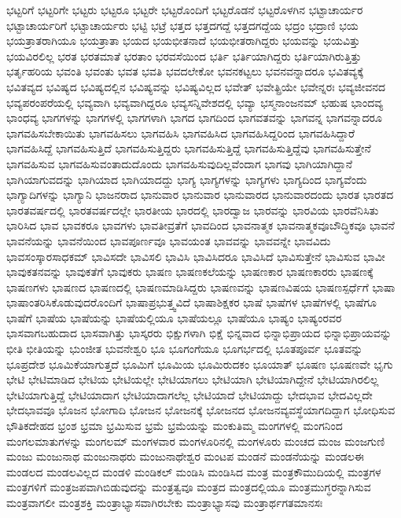 {ಭಟ್ಟರಿಗೆ
ಭಟ್ಟರಿಗೇ
ಭಟ್ಟರು
ಭಟ್ಟರೂ
ಭಟ್ಟರೇ
ಭಟ್ಟರೊಂದಿಗೆ
ಭಟ್ಟರೊಡನೆ
ಭಟ್ಟರೊಳಗಿನ
ಭಟ್ಟಾಚಾರ್ಯರ
ಭಟ್ಟಾಚಾರ್ಯರಿಗೆ
ಭಟ್ಟಾಚಾರ್ಯರು
ಭಟ್ಟಿ
ಭಟ್ರೆ
ಭತ್ತದ
ಭತ್ತದಗದ್ದೆ
ಭತ್ತದಗದ್ದೆಯ
ಭದ್ರಂ
ಭದ್ರಾಣಿ
ಭಯ
ಭಯತ್ರಾತರಾಗಿಯೂ
ಭಯತ್ರಾತಾ
ಭಯದ
ಭಯಭೀತನಾದೆ
ಭಯಭೀತರಾಗಿದ್ದರು
ಭಯವನ್ನು
ಭಯವಿತ್ತು
ಭಯವಿರಲಿಲ್ಲ
ಭರತ
ಭರತಮಾತೆ
ಭರತಾಂ
ಭರವಸೆಯಿಂದ
ಭರ್ತಿ
ಭರ್ತಿಯಾಗಿದ್ದರು
ಭರ್ತಿಯಾಗಿರುತ್ತಿತ್ತು
ಭರ್ತೃಹರಿಯ
ಭವಂತಿ
ಭವಂತು
ಭವತ
ಭವತಿ
ಭವದಲೇಕೋ
ಭವನಕಟ್ಟಲು
ಭವನವನ್ನಾದರೂ
ಭವಿತವ್ಯಕ್ಕೆ
ಭವಿತವ್ಯದ
ಭವಿಷ್ಯದ
ಭವಿಷ್ಯದಲ್ಲಿನ
ಭವಿಷ್ಯವನ್ನು
ಭವಿಷ್ಯವಿಲ್ಲದ
ಭವೇತ್
ಭವೇತ್ಪ್ರಿಯೇ
ಭವೇನ್ನರಃ
ಭವ್ಯಜೀವನದ
ಭವ್ಯಪರಂಪರೆಯಲ್ಲಿ
ಭವ್ಯವಾಗಿ
ಭವ್ಯವಾಗಿದ್ದರೂ
ಭವ್ಯಸನ್ನಿವೇಶದಲ್ಲಿ
ಭವ್ಯಾ
ಭಸ್ಮನಾಂಜನಮ್
ಭಹುಷ
ಭಾಂದವ್ಯ
ಭಾಂಧವ್ಯ
ಭಾಗಗಳನ್ನು
ಭಾಗಗಳಲ್ಲಿ
ಭಾಗಗಳಾಗಿ
ಭಾಗದ
ಭಾಗದಿಂದ
ಭಾಗವತವನ್ನು
ಭಾಗವನ್ನ
ಭಾಗವನ್ನಾದರೂ
ಭಾಗವಹಿಸಬೇಕಾಯಿತು
ಭಾಗವಹಿಸಲು
ಭಾಗವಹಿಸಿ
ಭಾಗವಹಿಸಿದ
ಭಾಗವಹಿಸಿದ್ದರಿಂದ
ಭಾಗವಹಿಸಿದ್ದಾರೆ
ಭಾಗವಹಿಸಿದ್ದೆ
ಭಾಗವಹಿಸುತ್ತಿದೆ
ಭಾಗವಹಿಸುತ್ತಿದ್ದರು
ಭಾಗವಹಿಸುತ್ತಿದ್ದೆ
ಭಾಗವಹಿಸುತ್ತಿದ್ದೆವು
ಭಾಗವಹಿಸುತ್ತೇನೆ
ಭಾಗವಹಿಸುವ
ಭಾಗವಹಿಸುವಂತಾದುದೊಂದು
ಭಾಗವಹಿಸುವುದಿಲ್ಲವೆಂದಾಗ
ಭಾಗವು
ಭಾಗಿಯಾಗಿದ್ದಾನೆ
ಭಾಗಿಯಾಗುವದನ್ನು
ಭಾಗಿಯಾದ
ಭಾಗಿಯಾದದ್ದು
ಭಾಗ್ಯ
ಭಾಗ್ಯಗಳನ್ನು
ಭಾಗ್ಯಗಳು
ಭಾಗ್ಯದಿಂದ
ಭಾಗ್ಯವೆಂದು
ಭಾಗ್ಯಾದಿಗಳನ್ನು
ಭಾಗ್ಯಾನಿ
ಭಾಜನರಾದ
ಭಾನುವಾರ
ಭಾನುವಾರ				
ಭಾನುವಾರದ
ಭಾನುವಾರದಂದು
ಭಾರತ
ಭಾರತದ
ಭಾರತವರ್ಷದಲ್ಲಿ
ಭಾರತವರ್ಷದಲ್ಲೇ
ಭಾರತೀಯ
ಭಾರದಲ್ಲಿ
ಭಾರದ್ವಾಜ
ಭಾರವನ್ನು
ಭಾರವಿಯ
ಭಾರವೆನಿಸಿತು
ಭಾರಿಸಿದ
ಭಾವ
ಭಾವಕರೂ
ಭಾವಗಳು
ಭಾವತೀವ್ರತೆಗೆ
ಭಾವದಿಂದ
ಭಾವನಾತ್ಮಕ
ಭಾವನಾತ್ಮಕವೂಬೌದ್ಧಿಕವೂ
ಭಾವನೆ
ಭಾವನೆಯನ್ನು
ಭಾವನೆಯಿಂದ
ಭಾವಪೂರ್ಣವೂ
ಭಾವಯಂತ
ಭಾವವನ್ನು
ಭಾವವನ್ನೇ
ಭಾವವಿದು
ಭಾವಸಂಸ್ಕಾರಸಾಧಕಮ್
ಭಾವಿಸದೇ
ಭಾವಿಸಲಿ
ಭಾವಿಸಿ
ಭಾವಿಸಿದರೂ
ಭಾವಿಸಿದೆ
ಭಾವಿಸುತ್ತೇನೆ
ಭಾವಿಸುವ
ಭಾವೀ
ಭಾವುಕತನವನ್ನು
ಭಾವುಕತೆಗೆ
ಭಾವುಕರು
ಭಾಷಣ
ಭಾಷಣಕಲೆಯನ್ನು
ಭಾಷಣಕಾರ
ಭಾಷಣಕಾರರು
ಭಾಷಣಕ್ಕೆ
ಭಾಷಣಗಳು
ಭಾಷಣದ
ಭಾಷಣದಲ್ಲಿ
ಭಾಷಣಮಾಡಿಸಿದ್ದರು
ಭಾಷಣವನ್ನು
ಭಾಷಣವಿಷಯ
ಭಾಷಣಸ್ಪರ್ಧೆಗೆ
ಭಾಷಾ
ಭಾಷಾಂತರಿಸಿಕೊಡುವುದರೊಂದಿಗೆ
ಭಾಷಾಪ್ರಭುತ್ತ್ವವಿದೆ
ಭಾಷಾಶಿಕ್ಷಕರ
ಭಾಷೆ
ಭಾಷೆಗಳ
ಭಾಷೆಗಳಲ್ಲಿ
ಭಾಷೆಗೂ
ಭಾಷೆಗೆ
ಭಾಷೆಯ
ಭಾಷೆಯನ್ನು
ಭಾಷೆಯಲ್ಲಿಯೂ
ಭಾಷೆಯಲ್ಲೂ
ಭಾಷೆಯೂ
ಭಾಷ್ಯಂ
ಭಾಷ್ಯಂರವರ
ಭಾಸವಾಗಬಹುದಾದ
ಭಾಸವಾಗಿತ್ತು
ಭಾಸ್ಕರರು
ಭಿಕ್ಷುಗಳಾಗಿ
ಭಿಕ್ಷೆ
ಭಿನ್ನವಾದ
ಭಿನ್ನಾಭಿಪ್ರಾಯದ
ಭಿನ್ನಾಭಿಪ್ರಾಯವನ್ನು
ಭೀತಿ
ಭೀತಿಯನ್ನು
ಭುಂಜೀತ
ಭುವನೇಶ್ವರಿ
ಭೂ
ಭೂಗಂಗೆಯೂ
ಭೂಗರ್ಭದಲ್ಲಿ
ಭೂತಪೂರ್ವ
ಭೂತವನ್ನು
ಭೂಪ್ರದೇಶ
ಭೂಮಿಕೆಯಾಗುತ್ತದೆ
ಭೂಮಿಗೆ
ಭೂಮಿಯ
ಭೂಮಿರುದಕಂ
ಭೂಯಾತ್
ಭೂಷಣ
ಭೂಷಣವೇ
ಭೃಗು
ಭೇಟಿ
ಭೇಟಿಮಾಡಿದ
ಭೇಟಿಯ
ಭೇಟಿಯಲ್ಲೇ
ಭೇಟಿಯಾಗಲು
ಭೇಟಿಯಾಗಿ
ಭೇಟಿಯಾಗಿದ್ದೇನೆ
ಭೇಟಿಯಾಗಿರಲಿಲ್ಲ
ಭೇಟಿಯಾಗುತ್ತಿದ್ದೆ
ಭೇಟಿಯಾದಾಗ
ಭೇಟಿಯಾದಾಗಲೆಲ್ಲ
ಭೇಟಿಯಾದೆ
ಭೇಟಿಯಾದ್ದು
ಭೇದಭಾವ
ಭೇದವಿಲ್ಲದೇ
ಭೇದಭಾವವೂ
ಭೊಜನ
ಭೋಗಾದಿ
ಭೋಜನ
ಭೋಜನಕ್ಕೆ
ಭೋಜನದ
ಭೋಜನವ್ಯವಸ್ಥೆಯಾಗದಿದ್ದಾಗ
ಭೋಧಿಸುವ
ಭೌತಿಕದೇಹದ
ಭ್ರಂಶ
ಭ್ರಮಾ
ಭ್ರಮಿಸುವ
ಭ್ರಮೆ
ಭ್ರಮೆಯನ್ನು
ಮಂಕುತಿಮ್ಮ
ಮಂಗಗಳಲ್ಲಿ
ಮಂಗನಿಂದ
ಮಂಗಲಮಾತುಗಳನ್ನು
ಮಂಗಲಮ್
ಮಂಗಳವಾರ
ಮಂಗಳೂರಿನಲ್ಲಿ
ಮಂಗಳೂರು
ಮಂಚದ
ಮಂಜ
ಮಂಜಗುಣಿ
ಮಂಜು
ಮಂಜುನಾಥ
ಮಂಜುನಾಥರು
ಮಂಜುನಾಥೇಶ್ವರ
ಮಂಟಪ
ಮಂಡನೆ
ಮಂಡನೆಯನ್ನು
ಮಂಡಲಈ
ಮಂಡಲದ
ಮಂಡಲವಿಲ್ಲದ
ಮಂಡಳಿ
ಮಂಡಿಕಲ್
ಮಂಡಿಸಿ
ಮಂಡಿಸಿದ
ಮಂತ್ರ
ಮಂತ್ರಕೌಮುದಿಯಲ್ಲಿ
ಮಂತ್ರಗಳ
ಮಂತ್ರಗಳಿಗೆ
ಮಂತ್ರಜಪವಾಗಿಬಿಡುವುದನ್ನು
ಮಂತ್ರತ್ವವೂ
ಮಂತ್ರದ
ಮಂತ್ರದಲ್ಲಿಯೂ
ಮಂತ್ರಮುಗ್ಧರನ್ನಾಗಿಸುವ
ಮಂತ್ರವಾಗಲೀ
ಮಂತ್ರಶಕ್ತಿ
ಮಂತ್ರಾಭ್ಯಾಸವಾಗಿರಬೇಕು
ಮಂತ್ರಾಭ್ಯಾಸವು
ಮಂತ್ರಾರ್ಥಗತಮಾನಸಃ
}
